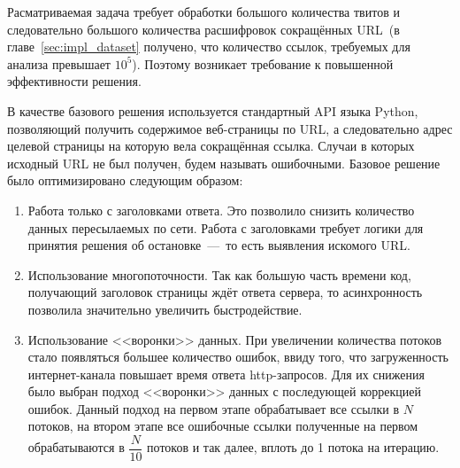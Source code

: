         Расматриваемая задача требует обработки большого количества твитов и следовательно большого количества расшифровок сокращённых
        URL~(в главе~\ref{sec:impl_dataset} получено, что количество ссылок, требуемых для анализа превышает $10^5$).
        Поэтому возникает требование к повышенной эффективности решения.

        В качестве базового решения используется стандартный API языка Python, позволяющий получить содержимое веб-страницы по URL,
        а следовательно адрес целевой страницы на которую вела сокращённая ссылка. Случаи в которых исходный URL не был получен, будем называть ошибочными.
        Базовое решение было оптимизировано следующим образом:
        \begin{enumerate}
            \item Работа только с заголовками ответа. Это позволило снизить количество данных пересылаемых по сети.
            Работа с заголовками требует логики для принятия решения об остановке~---~то есть выявления искомого URL.
            \item Использование многопоточности.
            Так как большую часть времени код, получающий заголовок страницы ждёт ответа сервера, то асинхронность позволила значительно увеличить быстродействие.
            \item Использование <<воронки>> данных. При увеличении количества потоков стало появляться большее количество ошибок,
            ввиду того, что загруженность интернет-канала повышает время ответа http-запросов.
            Для их снижения было выбран подход <<воронки>> данных с последующей коррекцией ошибок. Данный подход на первом этапе обрабатывает все ссылки в $N$ потоков,
            на втором этапе все ошибочные ссылки полученные на первом обрабатываются в $\dfrac{N}{10}$ потоков и так далее, вплоть до 1 потока на итерацию.
        \end{enumerate}
%

